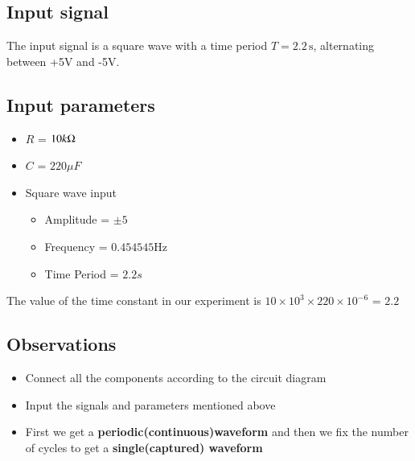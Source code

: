 \documentclass[journal]{IEEEtran}
\begin{document}
\subsection{Input signal}
The input signal is a square wave with a time period \( T = 2.2 \, \text{s} \), alternating between +5V and -5V. 
\begin{figure}[ht]
    \centering
\end{figure}
\subsection{Input parameters}
\begin{itemize}
    \item $R$ = $10 k \ohm$
    \item $C$ = $220 \mu F$
    \item Square wave input 
        \begin{itemize}
            \item Amplitude = $\pm 5$
            \item Frequency = $0.454545$Hz
            \item Time Period = $2.2s$
        \end{itemize}
\end{itemize}
The value of the time constant in our experiment is $10\times 10^3 \times220 
 \times 10^{-6}$ = $2.2$
\subsection{Observations}
\begin{itemize}
    \item Connect all the components according to the circuit diagram 
    \item Input the signals and parameters mentioned above
    \item First we get a \textbf{periodic(continuous)waveform} and then we fix the number of cycles to get a \textbf{single(captured) waveform}  
\end{itemize}
\end{document}
